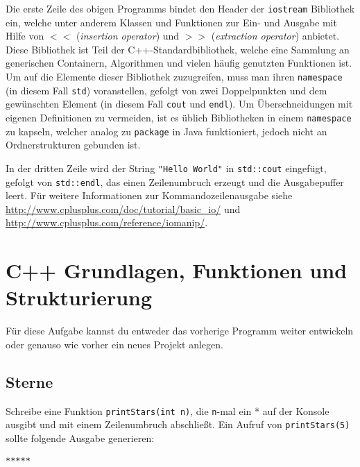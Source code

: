 Die erste Zeile des obigen Programms bindet den Header der \texttt{iostream} Bibliothek ein, welche unter anderem Klassen und Funktionen zur Ein- und Ausgabe mit Hilfe von $<<$ (\emph{insertion operator}) und $>>$ (\emph{extraction operator}) anbietet.
Diese Bibliothek ist Teil der C++-Standardbibliothek, welche eine Sammlung an generischen Containern, Algorithmen und vielen häufig genutzten Funktionen ist.
Um auf die Elemente dieser Bibliothek zuzugreifen, muss man ihren \texttt{namespace} (in diesem Fall \texttt{std}) voranstellen, gefolgt von zwei Doppelpunkten und dem gewünschten Element (in diesem Fall \texttt{cout} und \texttt{endl}).
Um Überschneidungen mit eigenen Definitionen zu vermeiden, ist es üblich Bibliotheken in einem \texttt{namespace} zu kapseln, welcher analog zu \texttt{package} in Java funktioniert, jedoch nicht an Ordnerstrukturen gebunden ist.

In der dritten Zeile wird der String \texttt{"Hello World"} in \texttt{std::cout} eingefügt, gefolgt von \texttt{std::endl}, das einen Zeilenumbruch erzeugt und die Ausgabepuffer leert. Für weitere Informationen zur Kommandozeilenausgabe siehe \url{http://www.cplusplus.com/doc/tutorial/basic_io/} und \url{http://www.cplusplus.com/reference/iomanip/}.




\newpage
\section{C++ Grundlagen, Funktionen und Strukturierung}
Für diese Aufgabe kannst du entweder das vorherige Programm weiter entwickeln oder genauso wie vorher ein neues Projekt anlegen.

\subsection{Sterne}
Schreibe eine Funktion \texttt{printStars(int n)}, die \texttt{n}-mal ein * auf der Konsole ausgibt und mit einem Zeilenumbruch abschließt.
Ein Aufruf von \texttt{printStars(5)} sollte folgende Ausgabe generieren:
\begin{lstlisting}
*****
\end{lstlisting}

